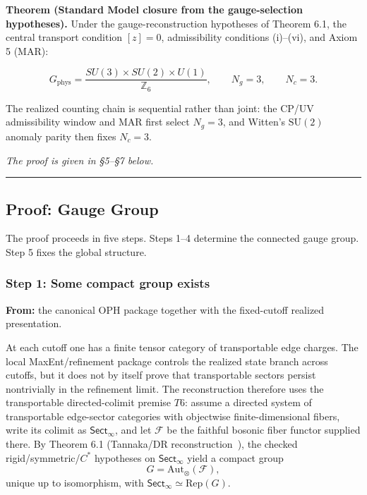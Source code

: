\textbf{Theorem (Standard Model closure from the gauge-selection hypotheses).} Under the gauge-reconstruction hypotheses of Theorem 6.1, the central transport condition \([z]=0\), admissibility conditions (i)--(vi), and Axiom 5 (MAR):

\[G_{\mathrm{phys}} = \frac{SU(3) \times SU(2) \times U(1)}{\mathbb{Z}_6}, \qquad N_g = 3, \qquad N_c = 3.\]

The realized counting chain is sequential rather than joint: the CP/UV admissibility window and MAR first select \(N_g = 3\), and Witten's \(\mathrm{SU}(2)\) anomaly parity then fixes \(N_c = 3\).

\emph{The proof is given in \S{}5--\S{}7 below.}

\begin{center}\rule{0.5\linewidth}{0.5pt}\end{center}

\subsection{Proof: Gauge Group}\label{5-proof-gauge-group}

The proof proceeds in five steps. Steps 1--4 determine the connected gauge group. Step 5 fixes the global structure.

\subsubsection{Step 1: Some compact group exists}\label{step-1-some-compact-group-exists}

\textbf{From:} the canonical OPH package together with the fixed-cutoff realized presentation.

At each cutoff one has a finite tensor category of transportable edge charges. The local MaxEnt/refinement package controls the realized state branch across cutoffs, but it does not by itself prove that transportable sectors persist nontrivially in the refinement limit. The reconstruction therefore uses the transportable directed-colimit premise \(T6\): assume a directed system of transportable edge-sector categories with objectwise finite-dimensional fibers, write its colimit as \(\mathsf{Sect}_\infty\), and let \(\mathcal F\) be the faithful bosonic fiber functor supplied there. By Theorem 6.1 (Tannaka/DR reconstruction~\cite{tannaka38,krein49,dr89,dr90}), the checked rigid/symmetric/\(C^*\) hypotheses on \(\mathsf{Sect}_\infty\) yield a compact group
\[
G=\mathrm{Aut}_\otimes(\mathcal F),
\]
unique up to isomorphism, with \(\mathsf{Sect}_\infty \simeq \mathrm{Rep}(G)\).

